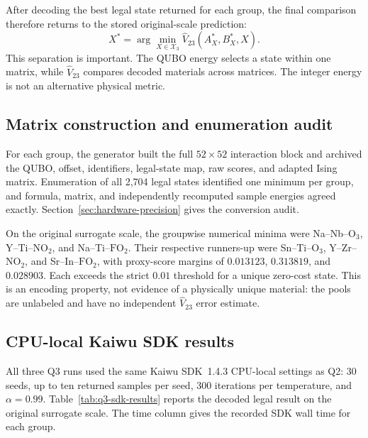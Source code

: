 After decoding the best legal state returned for each group, the final
comparison therefore returns to the stored original-scale prediction:
\begin{equation}
 X^*=\arg\min_{X\in\mathcal X_3}
 \widehat V_{23}(A_X^*,B_X^*,X).
 \label{eq:q3-original-scale-comparison}
\end{equation}
This separation is important.  The QUBO energy selects a state within one
matrix, while $\widehat V_{23}$ compares decoded materials across matrices.
The integer energy is not an alternative physical metric.

\subsection{Matrix construction and enumeration audit}

For each group, the generator built the full $52\times52$ interaction block
and archived the QUBO, offset, identifiers, legal-state map, raw scores, and
adapted Ising matrix.  Enumeration of all 2,704 legal states identified one
minimum per group, and formula, matrix, and independently recomputed sample
energies agreed exactly.  Section~\ref{sec:hardware-precision} gives the
conversion audit.

On the original surrogate scale, the groupwise numerical minima were
Na--Nb--$\mathrm O_3$, Y--Ti--$\mathrm{NO}_2$, and
Na--Ti--$\mathrm{FO}_2$.  Their respective runners-up were
Sn--Ti--$\mathrm O_3$, Y--Zr--$\mathrm{NO}_2$, and
Sr--In--$\mathrm{FO}_2$, with proxy-score margins of $0.013123$,
$0.313819$, and $0.028903$.  Each exceeds the strict $0.01$ threshold for
a unique zero-cost state.  This is an encoding property, not evidence of a
physically unique material: the pools are unlabeled and have no independent
$\widehat V_{23}$ error estimate.

\subsection{CPU-local Kaiwu SDK results}

All three Q3 runs used the same Kaiwu SDK~1.4.3 CPU-local settings as
Q2: 30 seeds, up to ten returned samples per seed, 300 iterations per
temperature, and $\alpha=0.99$.  Table~\ref{tab:q3-sdk-results} reports
the decoded legal result on the original surrogate scale.  The time column
gives the recorded SDK wall time for each group.

